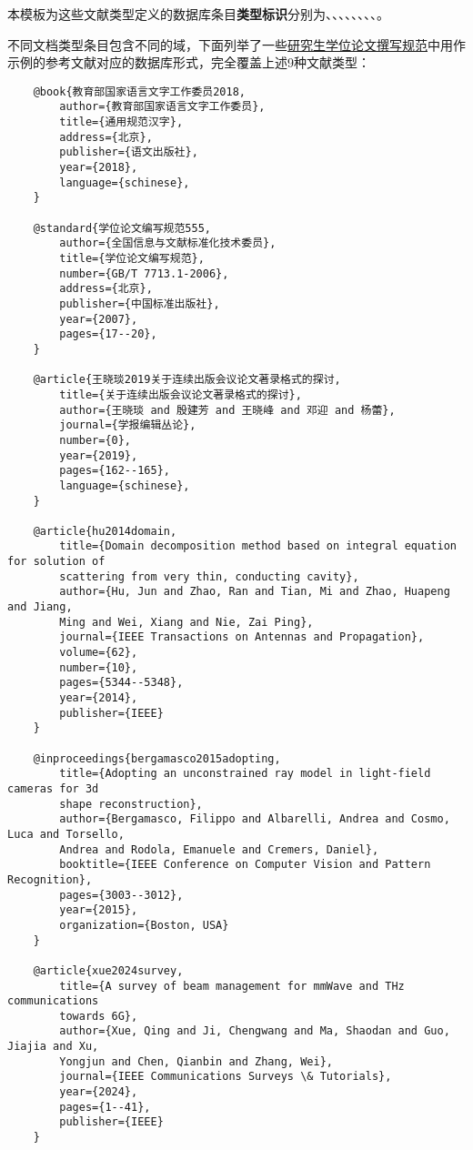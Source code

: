 \documentclass[print, promaster, vlined]{DissertUESTC}
\begin{document}
	本模板为这些文献类型定义的数据库条目\textbf{类型标识}分别为、、、、、、、、。
	
	不同文档类型条目包含不同的域，下面列举了一些\href{https://gr.uestc.edu.cn/xiazai/114/3917}{研究生学位论文撰写规范}中用作示例的参考文献对应的数据库形式，完全覆盖上述9种文献类型：
	
	\begin{verbatim}
	@book{教育部国家语言文字工作委员2018,
	    author={教育部国家语言文字工作委员},
	    title={通用规范汉字},
	    address={北京},
	    publisher={语文出版社},
	    year={2018},
	    language={schinese},
	}
	
	@standard{学位论文编写规范555,
	    author={全国信息与文献标准化技术委员},
	    title={学位论文编写规范},
	    number={GB/T 7713.1-2006},
	    address={北京},
	    publisher={中国标准出版社},
	    year={2007},
	    pages={17--20},
	}
	
	@article{王晓琰2019关于连续出版会议论文著录格式的探讨,
	    title={关于连续出版会议论文著录格式的探讨},
	    author={王晓琰 and 殷建芳 and 王晓峰 and 邓迎 and 杨蕾},
	    journal={学报编辑丛论},
	    number={0},
	    year={2019},
	    pages={162--165},
	    language={schinese},
	}
	
	@article{hu2014domain,
	    title={Domain decomposition method based on integral equation for solution of
	    scattering from very thin, conducting cavity},
	    author={Hu, Jun and Zhao, Ran and Tian, Mi and Zhao, Huapeng and Jiang,
	    Ming and Wei, Xiang and Nie, Zai Ping},
	    journal={IEEE Transactions on Antennas and Propagation},
	    volume={62},
	    number={10},
	    pages={5344--5348},
	    year={2014},
	    publisher={IEEE}
	}
	
	@inproceedings{bergamasco2015adopting,
	    title={Adopting an unconstrained ray model in light-field cameras for 3d
	    shape reconstruction},
	    author={Bergamasco, Filippo and Albarelli, Andrea and Cosmo, Luca and Torsello,
	    Andrea and Rodola, Emanuele and Cremers, Daniel},
	    booktitle={IEEE Conference on Computer Vision and Pattern Recognition},
	    pages={3003--3012},
	    year={2015},
	    organization={Boston, USA}
	}
	
	@article{xue2024survey,
	    title={A survey of beam management for mmWave and THz communications
	    towards 6G},
	    author={Xue, Qing and Ji, Chengwang and Ma, Shaodan and Guo, Jiajia and Xu,
	    Yongjun and Chen, Qianbin and Zhang, Wei},
	    journal={IEEE Communications Surveys \& Tutorials},
	    year={2024},
	    pages={1--41},
	    publisher={IEEE}
	}
	

\end{verbatim}
\end{document}
